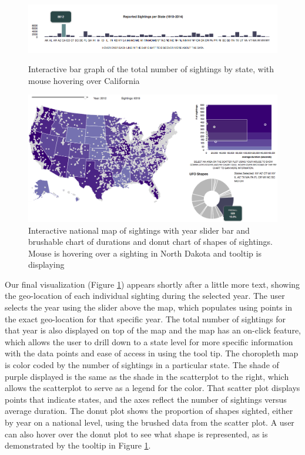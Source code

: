 \documentclass[journal]{vgtc}                %
\begin{document}
\begin{figure}[h]
\centering
\includegraphics[width=\textwidth]{sightings_count.png}
\caption{Interactive bar graph of the total number of sightings by state, with mouse hovering over California}
\label{sightings}
\includegraphics[width=\textwidth]{map.png}
\caption{Interactive national map of sightings with year slider bar and brushable chart of durations and donut chart of shapes of sightings. Mouse is hovering over a sighting in North Dakota and tooltip is displaying }
\label{map}
\end{figure}


Our final visualization (Figure \ref{map}) appears shortly after a little more text, showing the geo-location of each individual sighting during the selected year. The user selects the year using the slider above the map, which populates using points in the exact geo-location for that specific year. The total number of sightings for that year is also displayed on top of the map and the map has an on-click feature, which allows the user to drill down to a state level for more specific information with the data points and ease of access in using the tool tip. The choropleth map is color coded by the number of sightings in a particular state. The shade of purple displayed is the same as the shade in the scatterplot to the right, which allows the scatterplot to serve as a legend for the color. That scatter plot displays points that indicate states, and the axes reflect the number of sightings versus average duration. The donut plot shows the proportion of shapes sighted, either by year on a national level, using the brushed data from the scatter plot. A user can also hover over the donut plot to see what shape is represented, as is demonstrated by the tooltip in Figure \ref{map}.
\end{document}
